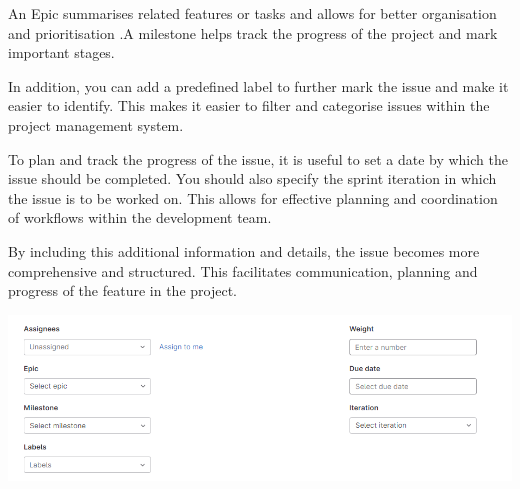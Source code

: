 \documentclass[12pt]{article}
\begin{document}
An Epic summarises related features or tasks and allows for better organisation and prioritisation .A milestone helps track the progress of the project and mark important stages.

In addition, you can add a predefined label to further mark the issue and make it easier to identify. This makes it easier to filter and categorise issues within the project management system.

To plan and track the progress of the issue, it is useful to set a date by which the issue should be completed. You should also specify the sprint iteration in which the issue is to be worked on. This allows for effective planning and coordination of workflows within the development team.

By including this additional information and details, the issue becomes more comprehensive and structured. This facilitates communication, planning and progress of the feature in the project.

 \includegraphics[width=\textwidth]{issue2.png}
 
\end{document}
